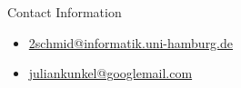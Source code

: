 \documentclass[final]{beamer}
\newlength{\onecolwid}
\begin{document}
\begin{frame}[t]
\begin{columns}[t]
\begin{column}{\onecolwid}
\begin{alertblock}{Contact Information}
\begin{itemize}
\item \href{mailto:2schmid@informatik.uni-hamburg.de}{2schmid@informatik.uni-hamburg.de}
\item \href{mailto:juliankunkel@googlemail.com}{juliankunkel@googlemail.com}
\end{itemize}

\end{alertblock}

\begin{flushright}
\begin{tabular}{r}
\end{tabular}
\end{flushright}


\end{column} %

\end{columns} %

\end{frame} %
\end{document}
